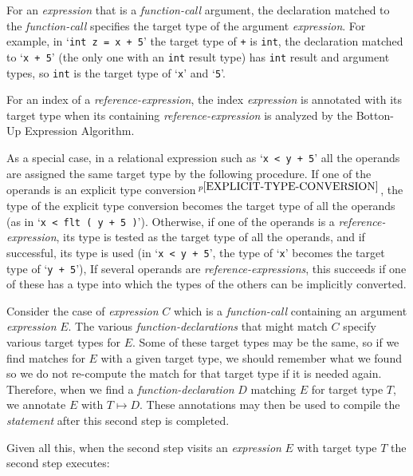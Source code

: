 \documentclass[12pt]{article}
\newcommand{\pagnote}[1]{$\,^{p\pageref{#1}}$}
\begin{document}
For an {\em expression} that is a {\em function-call} argument,
the declaration matched to the {\em function-call} specifies the
target type of the argument {\em expression}.  For example, in
`{\tt int z = x + 5}' the target type of {\tt +} is {\tt int},
the declaration matched to `{\tt x +  5}' (the only one with an {\tt int}
result type) has {\tt int} result
and argument types, so {\tt int} is the target type of `{\tt x}' and `{\tt 5}'.

For an index of a {\em reference-expression}, the
index {\em expression} is annotated with its target type when its
containing {\em reference-expression} is analyzed by the Botton-Up
Expression Algorithm.

As a special case, in a relational expression such as `{\tt x < y + 5}'
all the operands are assigned the same target type by the following
procedure.
If one of the operands is
an explicit type conversion\pagnote{EXPLICIT-TYPE-CONVERSION},
the type of the explicit type conversion
becomes the target type of all the operands
(as in `{\tt x < flt ( y + 5 )}').
Otherwise, if
one of the operands is a {\em reference-expression},
its type is tested as the target type of all the operands,
and if successful, its type is used
(in `{\tt x < y + 5}',
the type of `{\tt x}' becomes the target type of `{\tt y + 5}'),
If several operands are {\em reference-expressions}, this succeeds if
one of these has a type into which the types of the others can be
implicitly converted.

Consider the case of {\em expression} $C$ which is a {\em function-call}
containing an argument {\em expression} $E$.  The various
{\em function-declarations} that might match $C$ specify various
target types for $E$.  Some of these target types may be the same,
so if we find matches for $E$ with a given target type, we should
remember what we found so we do not re-compute the match for
that target type if it is needed again.  Therefore, when we find a
{\em function-declaration} $D$ matching $E$ for target type $T$, we annotate
$E$ with $T\mapsto D$.  These annotations may then be used to compile
the {\em statement} after this second step is completed.

Given all this, when the second step visits an {\em expression} $E$ with
target type $T$ the second step executes:


\bigskip
\end{document}
